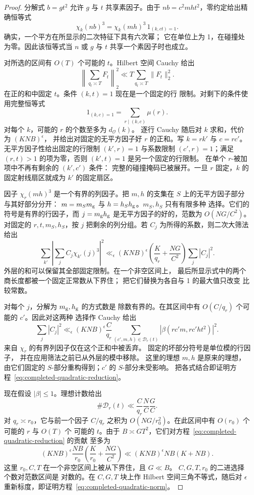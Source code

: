 \documentclass[11pt,a4paper]{article}
\numberwithin{equation}{section}
\numberwithin{figure}{section}
\theoremstyle{definition}
\theoremstyle{remark}
\begin{document}
\begin{proof}
分解式 $b=gt^2$ 允许 $g$ 与 $t$ 共享素因子。由于
$nb=c^2mht^2$，零约定给出精确恒等式
\begin{equation}\label{eq:completed-quadratic-zero-mask}
 \chi_k(nb)^3=\chi_k(mh)^3\,1_{(k,ct)=1}.
\end{equation}
确实，一个平方在所显示的二次特征下具有六次幂；
它在单位上为 1，在碰撞处为零。因此该恒等式当
$n$ 或 $g$ 与 $t$ 共享一个素因子时也成立。

对所选的区间有 $O(T)$ 个可能的 $t$。Hilbert 空间 Cauchy
给出
\[
 \left\|\sum_{q_t\asymp T}F_t\right\|_2^2
 \ll T\sum_{q_t\asymp T}\|F_t\|_2^2.
\]
在正的和中固定 $t$。条件 $(k,t)=1$ 现在是一个固定的行
限制。对剩下的条件使用完整恒等式
\[
 1_{(k,c)=1}=\sum_{r\mid(k,c)}\mu(r).
\]
对每个 $k$，可能的 $r$ 的个数至多为 $d_{\mathcal O}(k)$。
逐行 Cauchy 随后对 $k$ 求和，代价为 $(KNB)^\epsilon$，
并给出对固定的无平方因子好 $r$ 的正和。写
$k=rk'$ 与 $c=rc'$。无平方因子性给出固定的行限制
$(k',r)=1$ 与系数限制 $(c',r)=1$；满足
$(r,t)>1$ 的项为零，否则 $(k',t)=1$ 是另一个固定的行限制。
在单个 $r$-被加项中不再有剩余的 $(k',c')$ 条件：
完整的碰撞掩码已被展开。一旦 $r$ 固定，$k$
的固定射线扇区就成为 $k'$ 的固定扇区。

因子 $\chi_r(mh)^3$ 是一个有界的列因子。把 $m,h$
的支集在 $S$ 上的无平方因子部分与其好部分分开：
$m=m_Sm_{\rm g}$ 与 $h=h_Sh_{\rm g}$。$m_S,h_S$ 只有有限多种
选择。它们的符号是有界的行因子，而
$j=m_{\rm g}h_{\rm g}$ 是无平方因子的好的，范数为 $O(NG/C^2)$。
对固定的 $r,t,m_S,h_S$，按 $j$ 把剩余的列分组。若 $C_j$
为所得的系数，则二次大筛法给出
\[
 \sum_{k'}\left|\sum_j C_j\chi_{k'}(j)^3\right|^2
 \ll_\epsilon (KNB)^\epsilon
       \left(\frac K{q_r}+\frac{NG}{C^2}\right)\sum_j|C_j|^2.
\]
外层的和可以保留其全部固定限制。在一个非空区间上，
最后所显示式中的两个商长度都被一个固定正常数从下界住；
把它们替换为各自与 1 的最大值只改变
比较常数。

对每个 $j$，分解为 $m_{\rm g},h_{\rm g}$ 的方式数是
除数有界的。在其区间中有 $O(C/q_r)$ 个可能的 $c'$。因此对这两种
选择作 Cauchy 给出
\[
 \sum_j|C_j|^2
 \ll_\epsilon (KNB)^\epsilon\frac C{q_r}
 \sum_{(c',m,h)\in\mathcal D_r(t)}
          |\beta(rc'm,rc'ht^2)|^2.
\]
来自 $\chi_r$ 的有界列因子仅在这个正和中被丢弃。
固定的坏部分符号是单位模的行因子，
并在应用筛法之前已从外层的模中移除。
这里的理想 $m,h$ 是原来的理想，
由它们固定的 $S$-部分重构得到；$c'$ 的 $S$-部分未受影响。
把各式结合即证明方程~\eqref{eq:completed-quadratic-reduction}。

现在假设 $|\beta|\le1$。理想计数给出
\[
 \#\mathcal D_r(t)\ll
       \frac C{q_r}\frac NC\frac GC.
\]
对 $q_r\asymp r_0$，它与前一个因子 $C/q_r$ 之积为
$O(NG/r_0^2)$。在此区间中有 $O(r_0)$ 个可能的 $r$ 与 $O(T)$ 个
可能的 $t$。由于 $B\asymp GT^2$，它们对方程~\eqref{eq:completed-quadratic-reduction} 的贡献
至多为
\[
 (KNB)^\epsilon\frac{NB}{r_0}
       \left(\frac K{r_0}+\frac{NG}{C^2}\right)
 \ll (KNB)^\epsilon NB(K+NB).
\]
这里 $r_0,C,T$ 在一个非空区间上被从下界住，且 $G\ll B$。
$C,G,T,r_0$ 的二进选择个数对范数区间是
对数的。在 $C,G,T$ 块上作 Hilbert 空间三角不等式，随后对
$\epsilon$ 重新标度，即证明方程~\eqref{eq:completed-quadratic-norm}。
\end{proof}
\end{document}

